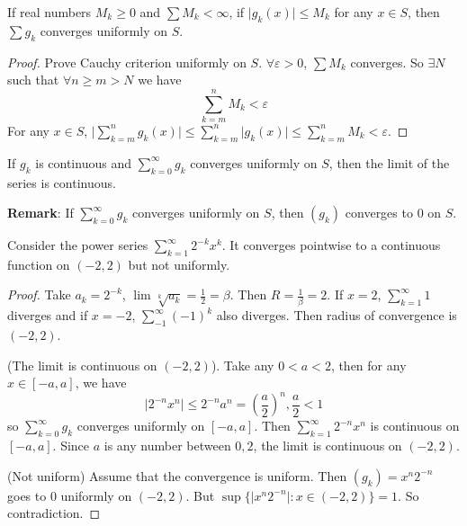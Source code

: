 \documentclass{report}
\begin{document}
\begin{theorem}{25.7}
    If real numbers $M_{k} \geq 0$ and $\sum M_{k} < \infty$, if $\lvert g_{k}(x) \rvert \leq M_{k}$ for any $x \in S$, then $\sum g_{k}$ converges uniformly on $S$. 
\end{theorem}
    \begin{proof}
        Prove Cauchy criterion uniformly on $S$. $\forall \varepsilon> 0$, $\sum M_{k}$ converges. So $\exists N$ such that $\forall n \geq m > N$ we have
            \begin{equation*}
                \sum_{k = m}^{n}M_{k} < \varepsilon
            \end{equation*}
        For any $x \in S$, $\lvert \sum_{k = m}^{n} g_{k}(x)\rvert \leq \sum_{k = m}^{n}\lvert g_{k}(x) \rvert \leq \sum_{k = m}^{n} M_{k} < \varepsilon$.
    \end{proof}

\begin{theorem}{25.5}
    If $g_{k}$ is continuous and $\sum_{k = 0}^{\infty}g_{k}$ converges uniformly on $S$, then the limit of the series is continuous.
\end{theorem}

\textbf{Remark}: If $\sum_{k = 0}^{\infty} g_{k}$ converges uniformly on $S$, then $(g_{k})$ converges to $0$ on $S$.

\begin{examples}
    \begin{example}
        Consider the power series $\sum_{k = 1}^{\infty} 2^{-k}x^{k}$. It converges pointwise to a continuous function on $(-2, 2)$ but not uniformly.
            \begin{proof}
                Take $a_{k} = 2^{-k}$, $\lim \sqrt[k]{a_{k}} = \frac{1}{2} = \beta$. Then $R = \frac{1}{\beta} = 2$. If $x = 2$, $\sum_{k = 1}^{\infty} 1$ diverges and if $x = -2$, $\sum_{-1}^{\infty} (-1)^{k}$ also diverges. Then radius of convergence is $(-2, 2)$. 

                (The limit is continuous on $(-2, 2)$). Take any $0 < a< 2$, then for any $x \in [-a, a]$, we have 
                    \begin{equation*}
                        \lvert 2^{-n}x^{n} \rvert \leq 2^{-n}a^{n} = \left(\dfrac{a}{2}\right)^{n}, \dfrac{a}{2} < 1
                    \end{equation*}
                so $\sum_{k = 0}^{\infty} g_{k}$ converges uniformly on $[-a, a]$. Then $\sum_{k = 1}^{\infty} 2^{-n}x^{n}$ is continuous on $[-a, a]$. Since $a$ is any number between $0, 2$, the limit is continuous on $(-2, 2)$.

                (Not uniform) Assume that the convergence is uniform. Then $(g_{k}) = x^{n}2^{-n}$ goes to $0$ uniformly on $(-2, 2)$. But $\sup \{\lvert x^{n}2^{-n} \rvert : x \in (-2, 2)\} = 1$. So contradiction.
            \end{proof}
    \end{example}
\end{examples}
\end{document}
